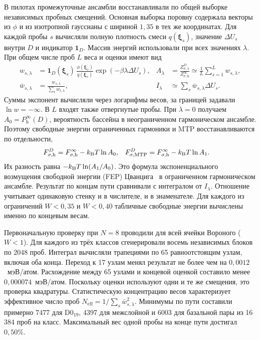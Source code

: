 В пилотах промежуточные ансамбли восстанавливали по общей выборке независимых
пробных смещений. Основная выборка поровну содержала векторы из $\phi$ и из
изотропной гауссианы с шириной $1{,}35$ в тех же координатах. Для каждой
пробы $s$ вычисляли полную плотность смеси $q(\boldsymbol\xi_s)$, значение
$\Delta U_s$ внутри $D$ и индикатор $\mathbf 1_D$. Массив энергий использовали
при всех значениях $\lambda$. При общем числе проб $L$ веса и оценки имеют вид
\begin{align}
 w_{s,\lambda}
 &=\mathbf 1_D(\boldsymbol\xi_s)\,
   \frac{\phi(\boldsymbol\xi_s)}{q(\boldsymbol\xi_s)}
                 \exp(-\beta\lambda\Delta U_s),&
 A_\lambda&=\frac{Z_{\sigma,\lambda}^D}{Z_{\sigma,\mathrm h}^{\infty}}
          \simeq \frac1L\sum_{s=1}^L w_{s,\lambda},\\
 \bar w_{s,\lambda}&=\frac{w_{s,\lambda}}{\sum_t w_{t,\lambda}},&
 I_\lambda&\simeq\sum_s\bar w_{s,\lambda}\Delta U_s .
\end{align}
Суммы экспонент вычисляли через логарифмы весов, за границей задавали
$\ln w=-\infty$. В $L$ входят также отвергнутые пробы. При $\lambda=0$
получаем $A_0=P_{\mathrm h}^\infty(D)$, вероятность бассейна в
неограниченном гармоническом ансамбле. Поэтому свободные энергии
ограниченных гармоники и MTP восстанавливаются по отдельности,
\begin{align}
 F_{\sigma,\mathrm h}^D&=F_{\sigma,\mathrm h}^\infty-k_{\rm B}T\ln A_0,&
 F_{\sigma,\mathrm{MTP}}^D&=F_{\sigma,\mathrm h}^\infty-k_{\rm B}T\ln A_1 .
\end{align}
Их разность равна $-k_{\rm B}T\ln(A_1/A_0)$. Это формула экспоненциального
возмущения свободной энергии (FEP) Цванцига~\cite{zwanzig1954} в
ограниченном гармоническом ансамбле. Результат по концам пути
сравнивали с интегралом от $I_\lambda$. Отношение учитывает одинаковую
стенку и в числителе, и в знаменателе. Для каждого из ограничений
$W<0{,}35$ и $W<0{,}40$ табличные свободные энергии вычислены именно по
концевым весам.

Первоначальную проверку при $N=8$ проводили для всей ячейки Вороного
($W<1$). Для каждого из трёх классов сгенерировали восемь независимых
блоков по 2048 проб. Интеграл вычисляли трапециями по 65 равноотстоящим
узлам, включая оба конца. Переход к 17 узлам менял результат не более чем
на $0{,}0012$~мэВ/атом. Расхождение между 65 узлами и концевой оценкой
составило менее $0{,}000074$~мэВ/атом. Поскольку оценки используют одни и
те же смещения, это проверка квадратуры. Статистическую концентрацию весов
характеризует эффективное число проб $N_{\mathrm{eff}}=1/\sum_s\bar
w_{s,\lambda}^2$. Минимумы по пути составили примерно 7477 для
D0$_{19}$, 4397 для межслойной и 6003 для базальной пары из 16\,384 проб на
класс. Максимальный вес одной пробы на конце пути достигал $0{,}50\%$.

